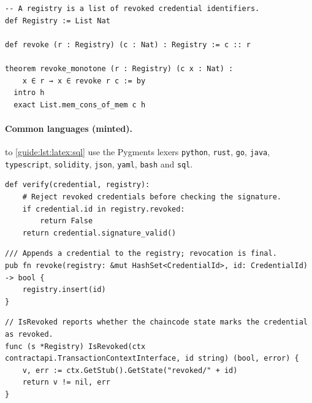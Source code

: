 \begin{lstlisting}[style=lean, float=tbp, caption={Lean 4: the registry only grows (\cref{guide:inv:latex:monotone}).}, label={lst:latex:lean}]
-- A registry is a list of revoked credential identifiers.
def Registry := List Nat

def revoke (r : Registry) (c : Nat) : Registry := c :: r

theorem revoke_monotone (r : Registry) (c x : Nat) :
    x ∈ r → x ∈ revoke r c := by
  intro h
  exact List.mem_cons_of_mem c h
\end{lstlisting}

\FloatBarrier
\paragraph{Common languages (minted).}
 to \cref{guide:lst:latex:sql} use the Pygments lexers \texttt{python}, \texttt{rust}, \texttt{go}, \texttt{java}, \texttt{typescript}, \texttt{solidity}, \texttt{json}, \texttt{yaml}, \texttt{bash} and \texttt{sql}.
\begin{listing}[!ht]
\begin{verbatim}
def verify(credential, registry):
    # Reject revoked credentials before checking the signature.
    if credential.id in registry.revoked:
        return False
    return credential.signature_valid()
\end{verbatim}
\caption{Python.}\label{guide:lst:latex:verify}
\end{listing}

\begin{listing}[!ht]
\begin{verbatim}
/// Appends a credential to the registry; revocation is final.
pub fn revoke(registry: &mut HashSet<CredentialId>, id: CredentialId) -> bool {
    registry.insert(id)
}
\end{verbatim}
\caption{Rust.}\label{guide:lst:latex:rust}
\end{listing}

\begin{listing}[!ht]
\begin{verbatim}
// IsRevoked reports whether the chaincode state marks the credential as revoked.
func (s *Registry) IsRevoked(ctx contractapi.TransactionContextInterface, id string) (bool, error) {
    v, err := ctx.GetStub().GetState("revoked/" + id)
    return v != nil, err
}
\end{verbatim}
\caption{Go (a Hyperledger Fabric chaincode function).}\label{guide:lst:latex:go}
\end{listing}

